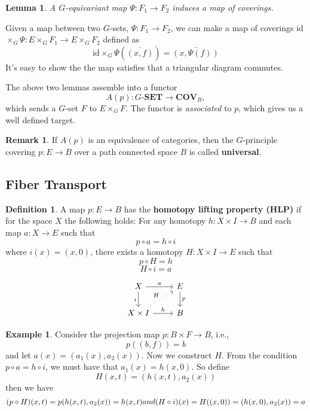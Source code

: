 \documentclass{article}
\newtheorem{lem}{Lemma}[section]
\theoremstyle{definition}
\newtheorem{exmp}{Example}[section]
\newtheorem{remark}{Remark}
\newtheorem{defn}{Definition}[section]
\begin{document}
\begin{lem}
A $G$-equivariant map $\Psi: F_1 \rightarrow F_2 $ induces a map of coverings.
\end{lem}
Given a map between two $G$-sets, $\Psi: F_1 \rightarrow F_2 $, we can make a map of coverings id$\times_G \Psi:E \times_{G} F_1\rightarrow E \times_{G} F_2 $ defined as $$\text{id}\times_G\Psi (\bar{(x,f)})=\bar{(x,\Psi(f))}$$ It's easy to show the the map satisfies that a triangular diagram commutes.

\noindent The above two lemmas assemble into a functor $$A(p): G\textbf{-SET} \rightarrow \textbf{COV}_B,$$ which sends a $G$-set $F$ to $E\times_{G}F$. The functor is \textit{associated} to $p$, which gives us a well defined target. 
\begin{remark}
If $A(p)$ is an equivalence of categories, then the $G$-principle covering $p: E \rightarrow B$ over a path connected space $B$ is called \textbf{universal}.
\end{remark}
\subsection{Fiber Transport}
\begin{defn}
A map $p: E \rightarrow B$ has the \textbf{homotopy lifting property (HLP)}  if for the space $X$ the following holds: For any  homotopy  $h: X \times I \rightarrow B$ and each map $a:X \rightarrow E$ such that $$p \circ a=h \circ i$$ where $i(x)=(x,0)$, there exists a homotopy $H: X \times I \rightarrow E$ such that $$p \circ H=h$$ $$H \circ i=a$$
\end{defn}

$$\begin{tikzcd}
X\arrow{r}{a}\arrow[d,"i"']  &E \arrow{d}{p}\\
X\times I \arrow{r}{h}\arrow[ur,"H",dotted] &B
\end{tikzcd}$$




\begin{exmp}
Consider the projection map $p:B \times F \rightarrow B$, i.e., $$p((b,f))=b$$ and let $a(x)=(a_1(x),a_2(x))$. Now we construct $H$. From the condition $p \circ a =h \circ i$, we must have that $a_1(x)=h(x,0)$. So define $$H(x,t)= (h(x,t),a_2(x))$$ then we have 
\[(p \circ H)(x,t)=p(h(x,t),a_2(x))\\ =h(x,t)$$ and $$(H \circ i)(x)=H((x,0))=(h(x,0),a_2(x))=a\]
\end{exmp}
\end{document}
